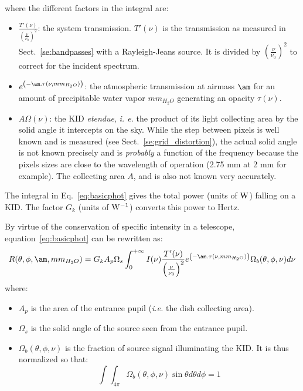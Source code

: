where the different factors in the integral are:
\begin{itemize}
\item $\frac{T'(\nu)}{\left(\frac{\nu}{\nu_{0}}\right)^{2}}$:  the
  system transmission. $T'(\nu)$ is the transmission as measured in
  Sect.~\ref{se:bandpasses} with a Rayleigh-Jeans source. It is
  divided by $\left(\frac{\nu}{\nu_{0}}\right)^{2}$ to correct for the
  incident spectrum.

\item $e^{\left(-\am . \tau(\nu,  mm_{H_{2}O} )\right)}$: the
  atmospheric transmission at airmass  $\am$ for an amount of
  precipitable water vapor $mm_{H_{2}O}$ generating an opacity $\tau(\nu)$.
\item $A\Omega (\nu) $: the KID \emph{etendue}, {\it i. e.} the product of
  its light collecting area by the solid angle it intercepts on the
  sky. While the step between pixels is well known and is measured
  (see Sect.~\ref{se:grid_distortion}), the
  actual solid angle is not known precisely and is {\em probably} a function of the
  frequency  because the pixels sizes are close to the wavelength of
  operation (2.75 mm at 2 mm for example). The collecting area $A$,  
  and is also not known very accurately.
\end{itemize}
The integral in Eq.~\ref{eq:basicphot} gives the total power (units of $\rm W$)
falling on a KID. The factor $G_{k}$ (units of  $\rm W^{-1}$) converts this
power to Hertz.%

By virtue of the conservation of specific intensity in a telescope,
equation~\ref{eq:basicphot} can be rewritten as:
\begin{equation}
R(\theta, \phi, \am, mm_{H_{2}O}) = G_{k} A_{p}\Omega_{s}\int_{0}^{+\infty} I(\nu)
\frac{T'(\nu)}{\left(\frac{\nu}{\nu_{0}}\right)^{2}} e^{\left(-\am
  . \tau(\nu,  mm_{H_{2}O})\right)} \Omega_{b} (\theta, \phi, \nu)  d\nu 
\label{eq:basicphot2}
\end{equation}
where:
\begin{itemize}
\item $A_{p}$ is the area of the entrance pupil ({\it i.e.} the
  dish collecting area).
\item $\Omega_{s}$ is the solid angle of the source seen from the
  entrance pupil.
\item $\Omega_{b}(\theta, \phi, \nu)$ is the fraction of source signal
  illuminating the KID. It is thus normalized so that:
\begin{equation}
\int\int_{4\pi} \Omega_{b}(\theta, \phi, \nu) \sin \theta d\theta
d\phi = 1 
\label{eq:omegabdef}
\end{equation}
\end{itemize}


